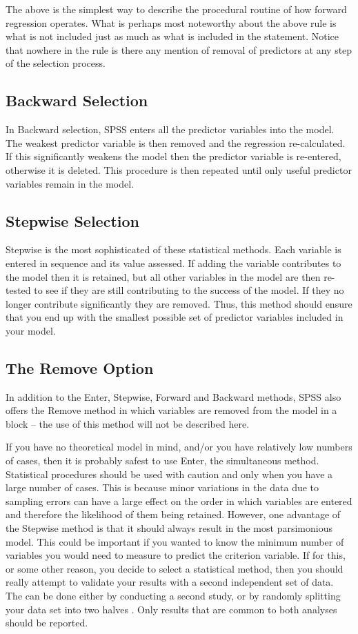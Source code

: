 The above is the simplest way to describe the procedural routine of how forward regression operates. What is perhaps most noteworthy about the above rule is what is not included just as much as what is included in the statement. Notice that nowhere in the rule is there any mention of removal of predictors at any step of the selection process. 


\subsection{Backward Selection}
In Backward selection, SPSS enters all the predictor variables into the model. The weakest predictor variable is then removed and the regression re-calculated. If this significantly weakens the model then the predictor variable is re-entered, otherwise it is deleted. This procedure is then repeated until only useful predictor variables remain in the model.


\subsection{Stepwise Selection}
Stepwise is the most sophisticated of these statistical methods. Each variable is entered in sequence and its value assessed. If adding the variable contributes to the model then it is retained, but all other variables in the model are then re-tested to see if they are still contributing to the success of the model. If they no longer contribute significantly they are removed. Thus, this method should ensure that you end up with the smallest possible set of predictor variables included in your model.

\subsection{The Remove Option}
In addition to the Enter, Stepwise, Forward and Backward methods, SPSS also offers the Remove method in which variables are removed from the model in a block – the use of this method will not be described here.


If you have no theoretical model in mind, and/or you have relatively low numbers
of cases, then it is probably safest to use Enter, the simultaneous method. Statistical
procedures should be used with caution and only when you have a large number of
cases. This is because minor variations in the data due to sampling errors can have a
large effect on the order in which variables are entered and therefore the likelihood
of them being retained. However, one advantage of the Stepwise method is that it
should always result in the most parsimonious model. This could be important if
you wanted to know the minimum number of variables you would need to measure
to predict the criterion variable. If for this, or some other reason, you decide to
select a statistical method, then you should really attempt to validate your results
with a second independent set of data. The can be done either by conducting a
second study, or by randomly splitting your data set into two halves . Only results that are common to both analyses should be reported.

